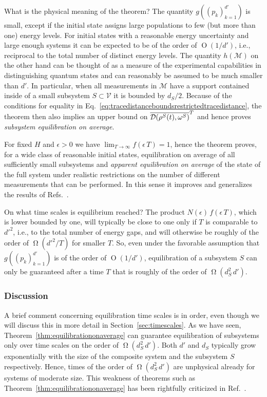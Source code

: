 \documentclass[a4paper,12pt,listof=totoc,index=totoc,bibliography=totoc,headsepline=false,headings=normal,BCOR16.153846mm,DIV12,headinclude,twoside,cleardoublepage=empty,numbers=noenddot,final]{scrreprt}
\theoremstyle{mystyle}
\numberwithin{equation}{section}
\numberwithin{figure}{section}
\numberwithin{lemma}{section}
\numberwithin{theorem}{section}
\numberwithin{corollary}{section}
\numberwithin{definition}{section}
\numberwithin{conjecture}{section}
\numberwithin{observation}{section}
\newcommand{\+}{\mkern2mu}
\newcommand{\texteqref}[1]{Eq.~\eqref{#1}}
\renewcommand{\H}{H}
\newcommand{\Vset}{\mathcal{V}}
\newcommand{\taverage}[2][]{
  \ifthenelse{\equal{#1}{}}
  {\overline{#2}}
  {\overline{#2}^{#1}}
}
\newcommand{\tracedistance}[3][]{
  \ifthenelse{\equal{#2}{}}
  {\ifthenelse{\equal{#3}{}}
    {\mathcal{D}_{#1}}{}
  }{
    \ifthenelse{\equal{#1}{}}
    {\operatorname{\mathcal{D}}(#2,#3)}
    {\operatorname{\mathcal{D}}_{#1}(#2,#3)}
  }
}
\DeclareMathOperator{\landauO}{O}
\DeclareMathOperator{\landauOmega}{\Omega}
\DeclareMathOperator{\1}{\mathds{1}}
\newcommand{\POVMs}{\mathcal{M}}
\begin{document}
What is the physical meaning of the theorem?
The quantity $g((p_k)_{k=1}^{d'})$ is small, except if the initial state assigns large populations to few (but more than one) energy levels. 
For initial states with a reasonable energy uncertainty and large enough systems it can be expected to be of the order of $\landauO(1/d')$, i.e., reciprocal to the total number of distinct energy levels.
The quantity $h(\POVMs)$ on the other hand can be thought of as a measure of the experimental capabilities in distinguishing quantum states and can reasonably be assumed to be much smaller than $d'$.
In particular, when all measurements in $\POVMs$ have a support contained inside of a small subsystem $S \subset \Vset$ it is bounded by $d_S/2$.
Because of the conditions for equality in \texteqref{eq:tracedistanceboundsrestrictedtracedistance}, the theorem then also implies an upper bound on $\taverage[T]{\tracedistance{\rho^S(t)}{\omega^S}}$ and hence proves \emph{subsystem equilibration on average}.

For fixed $\H$ and $\epsilon>0$ we have $\lim_{T\to\infty} f(\epsilon\,T) = 1$, hence the theorem proves, for a wide class of reasonable initial states, equilibration on average of all sufficiently small subsystems and \emph{apparent equilibration on average} of the state of the full system under realistic restrictions on the number of different measurements that can be performed.
In this sense it improves and generalizes the results of Refs.~\cite{Reimann08,Linden09}.

On what time scales is equilibrium reached?
The product $N(\epsilon)\,f(\epsilon\,T)$, which is lower bounded by one, will typically be close to one only if $T$ is comparable to ${d'}^2$, i.e., to the total number of energy gaps, and will otherwise be roughly of the order of $\landauOmega({d'}^2/T)$ for smaller $T$.
So, even under the favorable assumption that $g((p_k)_{k=1}^{d'})$ is of the order of $\landauO(1/d')$, equilibration of a subsystem $S$ can only be guaranteed after a time $T$ that is roughly of the order of $\landauOmega(d_S^2\,d')$.


\subsubsection*{Discussion}
%
A brief comment concerning equilibration time scales is in order, even though we will discuss this in more detail in Section~\ref{sec:timescales}.
As we have seen, Theorem~\ref{thm:equilibrationonaverage} can guarantee equilibration of subsystems only over time scales on the order of $\landauOmega(d_S^2\,d')$.
Both $d'$ and $d_S$ typically grow exponentially with the size of the composite system and the subsystem $S$ respectively.
Hence, times of the order of $\landauOmega(d_S^2\,d')$ are unphysical already for systems of moderate size.
This weakness of theorems such as Theorem~\ref{thm:equilibrationonaverage} has been rightfully criticized in Ref.~\cite{1109.4696v1}.
\end{document}
